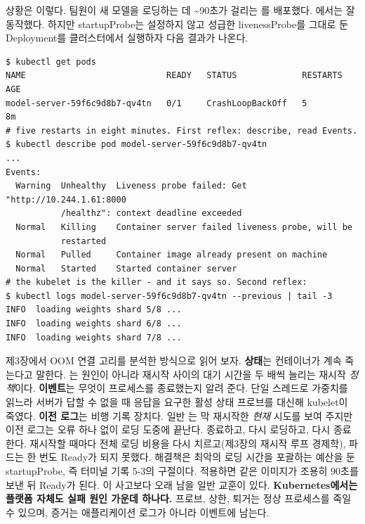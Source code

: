 상황은 이렇다. 팀원이 새 모델을 로딩하는 데 \textasciitilde{}90초가 걸리는 를 배포했다. 에서는 잘 동작했다. 하지만 startupProbe는 설정하지 않고 성급한 livenessProbe를 그대로 둔 Deployment를 클러스터에서 실행하자 다음 결과가 나온다.

\begin{terminalbox}
\begin{Verbatim}[breaklines=true,breakanywhere=true,fontsize=\small,formatcom=\color{tbbtermfg},codes=\tbbcodeactive]
$ kubectl get pods
NAME                            READY   STATUS             RESTARTS   AGE
model-server-59f6c9d8b7-qv4tn   0/1     CrashLoopBackOff   5          8m
# five restarts in eight minutes. First reflex: describe, read Events.
$ kubectl describe pod model-server-59f6c9d8b7-qv4tn
...
Events:
  Warning  Unhealthy  Liveness probe failed: Get "http://10.244.1.61:8000
           /healthz": context deadline exceeded
  Normal   Killing    Container server failed liveness probe, will be
           restarted
  Normal   Pulled     Container image already present on machine
  Normal   Started    Started container server
# the kubelet is the killer - and it says so. Second reflex:
$ kubectl logs model-server-59f6c9d8b7-qv4tn --previous | tail -3
INFO  loading weights shard 5/8 ...
INFO  loading weights shard 6/8 ...
INFO  loading weights shard 7/8 ...
\end{Verbatim}
\end{terminalbox}

제3장에서 OOM 연결 고리를 분석한 방식으로 읽어 보자. \textbf{상태}는 컨테이너가 계속 죽는다고 말한다. 는 원인이 아니라 재시작 사이의 대기 시간을 두 배씩 늘리는 재시작 \textit{정책}이다. \textbf{이벤트}는 무엇이 프로세스를 종료했는지 알려 준다. 단일 스레드로 가중치를 읽느라 서버가 답할 수 없을 때 응답을 요구한 활성 상태 프로브를 대신해 kubelet이 죽였다. \textbf{이전 로그}는 비행 기록 장치다. 일반 는 막 재시작한 \textit{현재} 시도를 보여 주지만 이전 로그는 오류 하나 없이 로딩 도중에 끝난다. 종료하고, 다시 로딩하고, 다시 종료한다. 재시작할 때마다 전체 로딩 비용을 다시 치르고(제3장의 재시작 루프 경제학), 파드는 한 번도 Ready가 되지 못했다. 해결책은 최악의 로딩 시간을 포괄하는 예산을 둔 startupProbe, 즉 터미널 기록 5-3의 구절이다. 적용하면 같은 이미지가 조용히 90초를 보낸 뒤 Ready가 된다. 이 사고보다 오래 남을 일반 교훈이 있다. \textbf{Kubernetes에서는 플랫폼 자체도 실패 원인 가운데 하나다.} 프로브, 상한, 퇴거는 정상 프로세스를 죽일 수 있으며, 증거는 애플리케이션 로그가 아니라 이벤트에 남는다.

